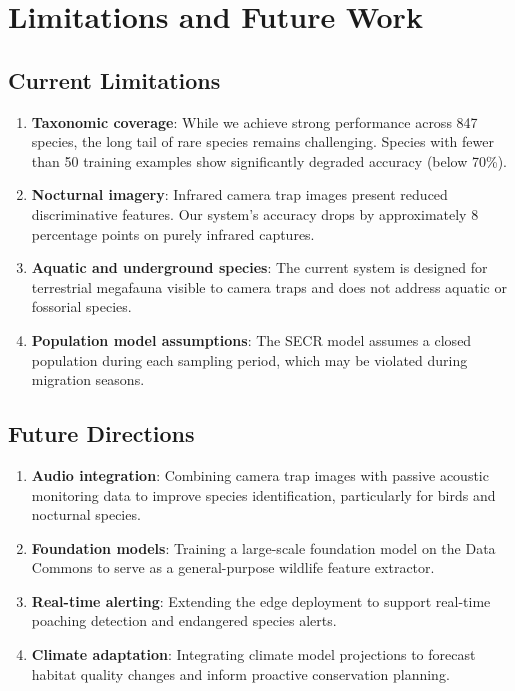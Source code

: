 \section{Limitations and Future Work}


\subsection{Current Limitations}

\begin{enumerate}[leftmargin=*]
    \item \textbf{Taxonomic coverage}: While we achieve strong performance across 847 species, the long tail of rare species remains challenging. Species with fewer than 50 training examples show significantly degraded accuracy (below 70\%).
    \item \textbf{Nocturnal imagery}: Infrared camera trap images present reduced discriminative features. Our system's accuracy drops by approximately 8 percentage points on purely infrared captures.
    \item \textbf{Aquatic and underground species}: The current system is designed for terrestrial megafauna visible to camera traps and does not address aquatic or fossorial species.
    \item \textbf{Population model assumptions}: The SECR model assumes a closed population during each sampling period, which may be violated during migration seasons.
\end{enumerate}

\subsection{Future Directions}

\begin{enumerate}[leftmargin=*]
    \item \textbf{Audio integration}: Combining camera trap images with passive acoustic monitoring data to improve species identification, particularly for birds and nocturnal species.
    \item \textbf{Foundation models}: Training a large-scale foundation model on the \Zoo{} Data Commons to serve as a general-purpose wildlife feature extractor.
    \item \textbf{Real-time alerting}: Extending the edge deployment to support real-time poaching detection and endangered species alerts.
    \item \textbf{Climate adaptation}: Integrating climate model projections to forecast habitat quality changes and inform proactive conservation planning.
\end{enumerate}

